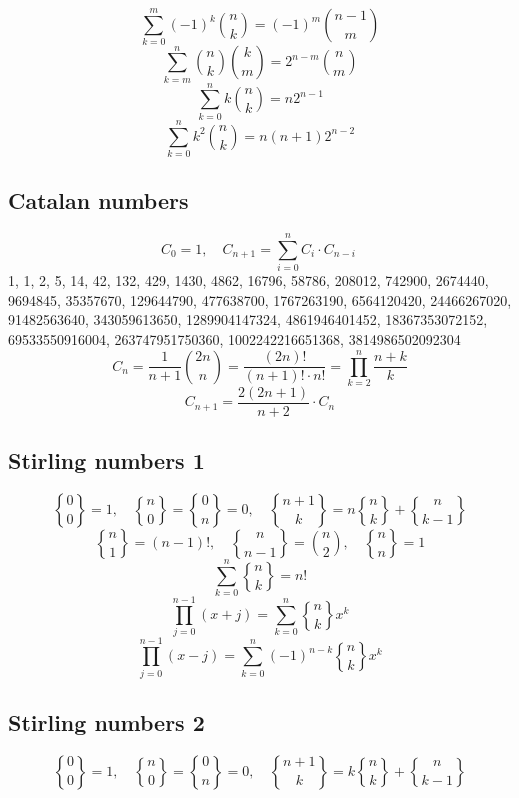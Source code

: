 \documentclass[11.5pt,a4paper,landscape,oneside]{amsart}
\newcommand{\Sequence}[1]{\subsection{#1}}
\newcommand{\stirlingii}{\genfrac{\{}{\}}{0pt}{}}
\begin{document}
\begin{multicols*}{2}
\begin{equation}
		\sum_{k=0}^m (-1)^k\binom{n}{k} = (-1)^m\binom{n-1}{m}
	\end{equation}
	\begin{equation}
		\sum_{k=m}^n \binom{n}{k}\binom{k}{m} = 2^{n-m}\binom{n}{m}
	\end{equation}
	\begin{equation}
		\sum_{k=0}^n k \binom{n}{k} = n 2^{n-1}
	\end{equation}
	\begin{equation}
		\sum_{k=0}^n k^2 \binom{n}{k} = n(n + 1)2^{n-2}
	\end{equation}
	\Sequence{Catalan numbers}
	\begin{equation}
		C_0 = 1,\quad C_{n+1}=\sum_{i=0}^{n}C_i\cdot C_{n-i}\
	\end{equation}
	1, 1, 2, 5, 14, 42, 132, 429, 1430, 4862, 16796, 58786, 208012, 742900, 2674440, 9694845, 35357670, 129644790, 477638700, 1767263190, 6564120420, 24466267020, 91482563640, 343059613650, 1289904147324, 4861946401452, 18367353072152, 69533550916004, 263747951750360, 1002242216651368, 3814986502092304
	\begin{equation}
		C_n = \frac{1}{n+1}\binom{2n}{n} = \frac{(2n)!}{(n+1)!\cdot n!} = \prod_{k=2}^{n}\frac{n+k}{k}
	\end{equation}
	\begin{equation}
		C_{n+1}=\frac{2(2n+1)}{n+2}\cdot C_n
	\end{equation}
	\Sequence{Stirling numbers 1}
	\begin{equation}
		\stirlingii{0}{0} = 1,\quad\stirlingii{n}{0}=\stirlingii{0}{n}=0,\quad\stirlingii{n+1}{k} = n \stirlingii{n}{k} + \stirlingii{n}{k-1}
	\end{equation}
	\begin{equation}
		\stirlingii{n}{1} = (n-1)!,\quad\stirlingii{n}{n-1}=\binom{n}{2},\quad\stirlingii{n}{n}=1
	\end{equation}
	\begin{equation}
		\sum_{k=0}^n\stirlingii{n}{k} = n!
	\end{equation}
	\begin{equation}
		\prod_{j=0}^{n-1}(x+j)=\sum_{k=0}^n \stirlingii{n}{k}x^k
	\end{equation}
	\begin{equation}
		\prod_{j=0}^{n-1}(x-j)=\sum_{k=0}^n (-1)^{n-k}\stirlingii{n}{k}x^k
	\end{equation}
	\Sequence{Stirling numbers 2}
	\begin{equation}
		\stirlingii{0}{0} = 1,\quad\stirlingii{n}{0}=\stirlingii{0}{n}=0,\quad\stirlingii{n+1}{k} = k \stirlingii{n}{k} + \stirlingii{n}{k-1}

\end{equation}
\end{multicols*}
\end{document}
